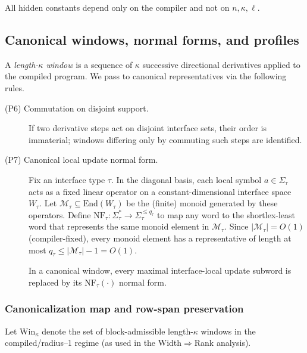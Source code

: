 \documentclass[12pt]{article}
\theoremstyle{definition}
\theoremstyle{definition}
\theoremstyle{remark}
\theoremstyle{remark}
\begin{document}
All hidden constants depend only on the compiler and not on $n,\kappa,\ell$.

\subsection{Canonical windows, normal forms, and profiles}
\label{sec:canonical-windows}

A \emph{length-$\kappa$ window} is a sequence of $\kappa$ successive directional derivatives applied to the compiled program.
We pass to canonical representatives via the following rules.

\begin{description}
\item[(P6) Commutation on disjoint support.] If two derivative steps act on disjoint interface sets, their order
is immaterial; windows differing only by commuting such steps are identified.

\item[(P7) Canonical local update normal form.]
Fix an interface type $\tau$. In the diagonal basis, each local symbol $a\in\Sigma_\tau$
acts as a fixed linear operator on a constant-dimensional interface space $W_\tau$.
Let $\mathcal{M}_\tau \subseteq \mathrm{End}(W_\tau)$ be the (finite) monoid generated by these operators.
Define $\mathrm{NF}_\tau:\Sigma_\tau^\ast \to \Sigma_\tau^{\le q_\tau}$ to map any word to the
shortlex-least word that represents the same monoid element in $\mathcal{M}_\tau$.
Since $|\mathcal{M}_\tau|=O(1)$ (compiler-fixed), every monoid element has a representative of length
at most $q_\tau \le |\mathcal{M}_\tau|-1 = O(1)$.

In a canonical window, every maximal interface-local update subword is replaced by its
$\mathrm{NF}_\tau(\cdot)$ normal form.
\end{description}


\subsubsection{Canonicalization map and row-span preservation}
\label{subsec:canonicalization-rowspan}

Let $\mathrm{Win}_\kappa$ denote the set of block-admissible length-$\kappa$ windows in the
compiled/radius--1 regime (as used in the Width$\Rightarrow$Rank analysis).
\end{document}

